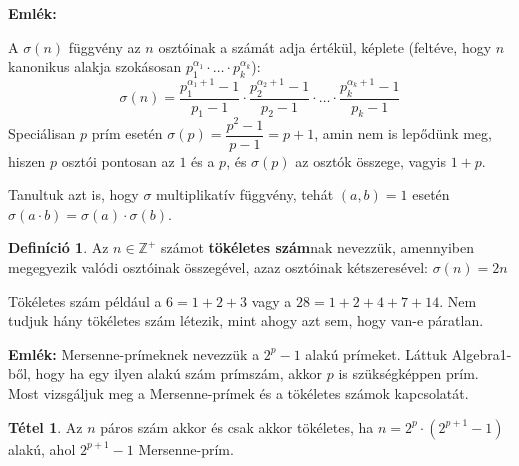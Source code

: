\documentclass[12pt]{book}
\theoremstyle{plain} %
\theoremstyle{definition} %
\newtheorem{defi/}{Definíció}[section]
\newenvironment{defi}
  {\renewcommand{\qedsymbol}{$\clubsuit$}%
   \pushQED{\qed}\begin{defi/}}
  {\popQED\end{defi/}}
\newtheorem{theo/}{Tétel}[section]
\newenvironment{theo}
  {\renewcommand{\qedsymbol}{$\clubsuit$}%
   \pushQED{\qed}\begin{theo/}}
  {\popQED\end{theo/}}
\theoremstyle{remark}
\renewcommand\qedsymbol{$\blacksquare$}
\numberwithin{equation}{section}  %
\def\Z{\mathbb{Z}}
\begin{document}
	\textbf{Emlék: }
	
	A $\sigma(n)$ függvény az $n$ osztóinak a számát adja értékül, képlete (feltéve, hogy $n$ kanonikus alakja szokásosan $p_1^{\alpha_1} \cdot \ldots \cdot p_k^{\alpha_k}$):
	\[ \sigma(n) = \dfrac{p_1^{\alpha_1+1}-1}{p_1 -1} \cdot \dfrac{p_2^{\alpha_2+1}-1}{p_2 -1} \cdot \ldots \cdot \dfrac{p_k^{\alpha_k+1}-1}{p_k -1} \]
	Speciálisan $p$ prím esetén $\sigma(p) = \dfrac{p^2-1}{p-1} = p+1$, amin nem is lepődünk meg, hiszen $p$ osztói pontosan az $1$ és a $p$, és $\sigma(p)$ az osztók összege, vagyis $1+p$.
	
	Tanultuk azt is, hogy $\sigma$ multiplikatív függvény, tehát $(a,b)=1$ esetén $\sigma(a\cdot b)= \sigma(a)\cdot \sigma(b)$.
	
	\begin{defi}
		Az $n\in \Z^{+}$ számot \textbf{tökéletes szám}nak nevezzük, amennyiben megegyezik valódi osztóinak összegével, azaz osztóinak kétszeresével: $\sigma(n) = 2n$
	\end{defi}

	Tökéletes szám például a $6=1+2+3$ vagy a $28=1+2+4+7+14$. Nem tudjuk hány tökéletes szám létezik, mint ahogy azt sem, hogy van-e páratlan.

	\textbf{Emlék:} Mersenne-prímeknek nevezzük a $2^p-1$ alakú prímeket. Láttuk Algebra1-ből, hogy ha egy ilyen alakú szám prímszám, akkor $p$ is szükségképpen prím. Most vizsgáljuk meg a Mersenne-prímek és a tökéletes számok kapcsolatát.
	
	\begin{theo}
		Az $n$ páros szám akkor és csak akkor tökéletes, ha $n=2^p\cdot (2^{p+1} - 1)$ alakú, ahol $2^{p+1}-1$ Mersenne-prím.
	\end{theo}
\end{document}
